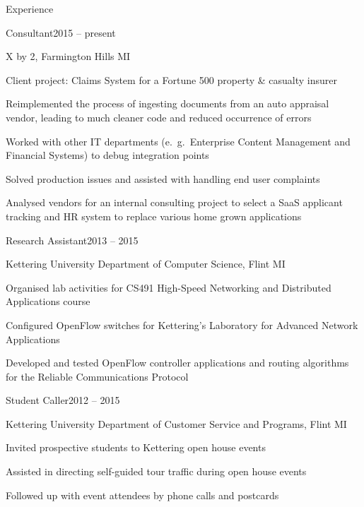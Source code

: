 \documentclass[letterpaper,12pt,oneside,compact]{article}
\begin{document}
\maketitle

\begin{heading}{Experience}
\begin{resitem}{Consultant\hfill 2015 -- present}
\item X by 2, Farmington Hills MI
\item Client project: Claims System for a Fortune 500 property \& casualty insurer
\item Reimplemented the process of ingesting documents from an auto appraisal 
      vendor, leading to much cleaner code and reduced occurrence of errors
\item Worked with other IT departments (e.\ g.\ Enterprise Content Management 
      and Financial Systems) to debug integration points
\item Solved production issues and assisted with handling end user complaints
\item Analysed vendors for an internal consulting project to select a 
      SaaS applicant tracking and HR system to replace various home grown 
      applications
\end{resitem}
	
	
\begin{resitem}{Research Assistant\hfill 2013 -- 2015}
\item Kettering University Department of Computer Science, Flint MI
\item Organised lab activities for CS491 High-Speed Networking and 
      Distributed Applications course
\item Configured OpenFlow switches for Kettering's Laboratory for Advanced 
      Network Applications
\item Developed and tested OpenFlow controller applications and routing algorithms 
      for the Reliable Communications Protocol
\end{resitem}

\begin{resitem}{Student Caller\hfill 2012 -- 2015}
\item Kettering University Department of Customer Service and Programs, Flint MI
\item Invited prospective students to Kettering open house events
\item Assisted in directing self-guided tour traffic during open house events
\item Followed up with event attendees by phone calls and postcards
\end{resitem}


\end{heading}
\end{document}
